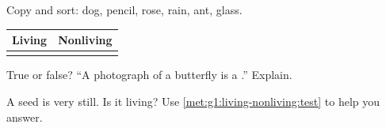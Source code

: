 \begin{exercise}[$\star$]\label{exo:g1:living-nonliving:3}
Copy and sort: dog, pencil, rose, rain, ant, glass.
\begin{center}
\begin{tabular}{c|c}
Living & Nonliving \\
\hline
 &  \\
\end{tabular}
\end{center}
\end{exercise}

\begin{exercise}[$\star$]\label{exo:g1:living-nonliving:4}
True or false? ``A photograph of a butterfly is a .''
Explain.
\end{exercise}

\begin{exercise}[$\star\star$]\label{exo:g1:living-nonliving:5}
A seed is very still. Is it living? Use
\cref{met:g1:living-nonliving:test} to help you answer.
\end{exercise}

